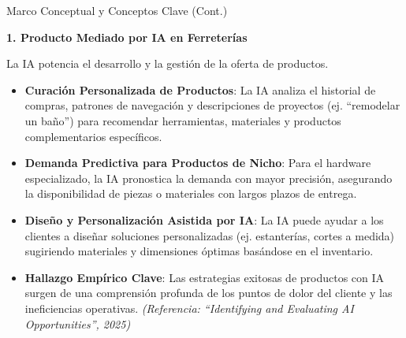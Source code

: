 \documentclass[aspectratio=169]{beamer}
\begin{document}
\begin{frame}{Marco Conceptual y Conceptos Clave (Cont.)}


\textbf{1. Producto Mediado por IA en Ferreterías}

La IA potencia el desarrollo y la gestión de la oferta de productos.

\begin{itemize}
  \item \textbf{Curación Personalizada de Productos}: La IA analiza el historial de compras, patrones de navegación y descripciones de proyectos (ej. ``remodelar un baño'') para recomendar herramientas, materiales y productos complementarios específicos.
  \item \textbf{Demanda Predictiva para Productos de Nicho}: Para el hardware especializado, la IA pronostica la demanda con mayor precisión, asegurando la disponibilidad de piezas o materiales con largos plazos de entrega.
  \item \textbf{Diseño y Personalización Asistida por IA}: La IA puede ayudar a los clientes a diseñar soluciones personalizadas (ej. estanterías, cortes a medida) sugiriendo materiales y dimensiones óptimas basándose en el inventario.
  \item \textbf{Hallazgo Empírico Clave}: Las estrategias exitosas de productos con IA surgen de una comprensión profunda de los puntos de dolor del cliente y las ineficiencias operativas. \textit{(Referencia: ``Identifying and Evaluating AI Opportunities'', 2025)}
\end{itemize}
\end{frame}
\end{document}
